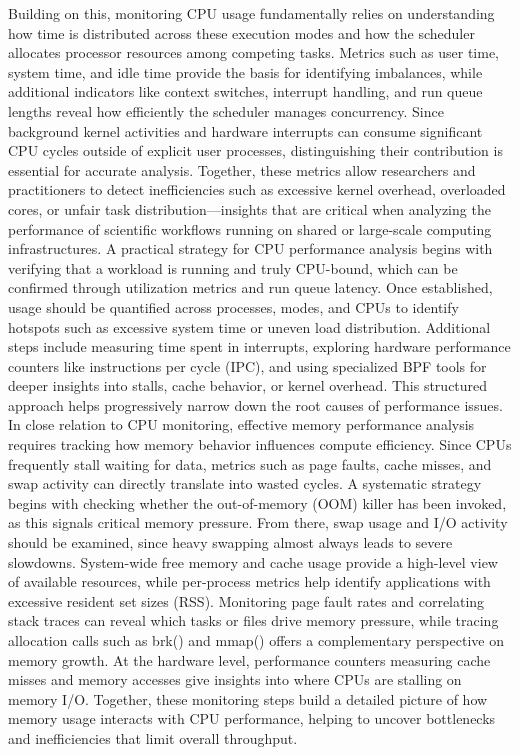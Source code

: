 Building on this, monitoring CPU usage fundamentally relies on understanding how time is distributed across these execution modes and how the scheduler allocates processor resources among competing tasks. Metrics such as user time, system time, and idle time provide the basis for identifying imbalances, while additional indicators like context switches, interrupt handling, and run queue lengths reveal how efficiently the scheduler manages concurrency. Since background kernel activities and hardware interrupts can consume significant CPU cycles outside of explicit user processes, distinguishing their contribution is essential for accurate analysis. Together, these metrics allow researchers and practitioners to detect inefficiencies such as excessive kernel overhead, overloaded cores, or unfair task distribution—insights that are critical when analyzing the performance of scientific workflows running on shared or large-scale computing infrastructures. A practical strategy for CPU performance analysis begins with verifying that a workload is running and truly CPU-bound, which can be confirmed through utilization metrics and run queue latency. Once established, usage should be quantified across processes, modes, and CPUs to identify hotspots such as excessive system time or uneven load distribution. Additional steps include measuring time spent in interrupts, exploring hardware performance counters like instructions per cycle (IPC), and using specialized BPF tools for deeper insights into stalls, cache behavior, or kernel overhead. This structured approach helps progressively narrow down the root causes of performance issues.
In close relation to CPU monitoring, effective memory performance analysis requires tracking how memory behavior influences compute efficiency. Since CPUs frequently stall waiting for data, metrics such as page faults, cache misses, and swap activity can directly translate into wasted cycles. A systematic strategy begins with checking whether the out-of-memory (OOM) killer has been invoked, as this signals critical memory pressure. From there, swap usage and I/O activity should be examined, since heavy swapping almost always leads to severe slowdowns. System-wide free memory and cache usage provide a high-level view of available resources, while per-process metrics help identify applications with excessive resident set sizes (RSS). Monitoring page fault rates and correlating stack traces can reveal which tasks or files drive memory pressure, while tracing allocation calls such as brk() and mmap() offers a complementary perspective on memory growth. At the hardware level, performance counters measuring cache misses and memory accesses give insights into where CPUs are stalling on memory I/O. Together, these monitoring steps build a detailed picture of how memory usage interacts with CPU performance, helping to uncover bottlenecks and inefficiencies that limit overall throughput.

